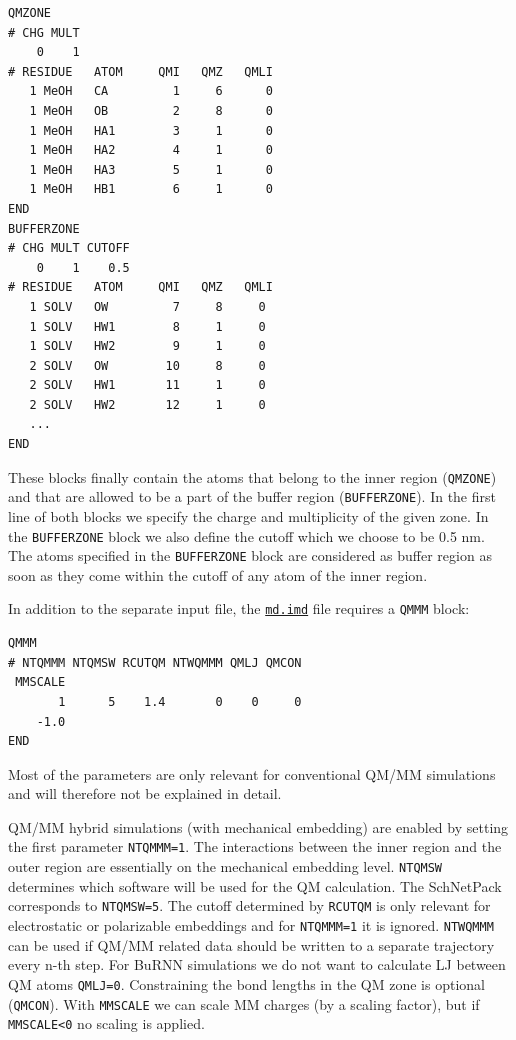 \begin{lstlisting}[breaklines=true, breakatwhitespace=false]
QMZONE
# CHG MULT
    0    1
# RESIDUE   ATOM     QMI   QMZ   QMLI
   1 MeOH   CA         1     6      0
   1 MeOH   OB         2     8      0
   1 MeOH   HA1        3     1      0
   1 MeOH   HA2        4     1      0
   1 MeOH   HA3        5     1      0
   1 MeOH   HB1        6     1      0
END
BUFFERZONE
# CHG MULT CUTOFF 
    0    1    0.5
# RESIDUE   ATOM     QMI   QMZ   QMLI
   1 SOLV   OW         7     8     0
   1 SOLV   HW1        8     1     0
   1 SOLV   HW2        9     1     0
   2 SOLV   OW        10     8     0
   2 SOLV   HW1       11     1     0
   2 SOLV   HW2       12     1     0
   ...
END
\end{lstlisting}


These blocks finally contain the atoms that belong to the inner region (\texttt{QMZONE}) and that are allowed to be a part of the buffer region (\texttt{BUFFERZONE}). In the first line of both blocks we specify the charge and multiplicity of the given zone. In the \texttt{BUFFERZONE} block we also define the cutoff which we choose to be 0.5 nm. The atoms specified in the \texttt{BUFFERZONE} block are considered as buffer region as soon as they come within the cutoff of any atom of the inner region.

In addition to the separate input file, the \href{https://github.com/LierB/gromos_tutorial_livecoms/blob/burnn_tutorial_rc/tutorial_files/t_06/md_burnn/md.imd}{\texttt{md.imd}} file requires a \texttt{QMMM} block:
\begin{lstlisting}[breaklines=true, breakatwhitespace=false]
QMMM
# NTQMMM NTQMSW RCUTQM NTWQMMM QMLJ QMCON      
 MMSCALE
       1      5    1.4       0    0     0
    -1.0
END
\end{lstlisting}

Most of the parameters are only relevant for conventional QM/MM simulations and will therefore not be explained in detail.

QM/MM hybrid simulations (with mechanical embedding) are enabled by setting the first parameter \texttt{NTQMMM=1}. The interactions between the inner region and the outer region are essentially on the mechanical embedding level. \texttt{NTQMSW} determines which software will be used for the QM calculation. The SchNetPack corresponds to \texttt{NTQMSW=5}. The cutoff determined by \texttt{RCUTQM} is only relevant for electrostatic or polarizable embeddings and for \texttt{NTQMMM=1} it is ignored. \texttt{NTWQMMM} can be used if QM/MM related data should be written to a separate trajectory every n-th step. For BuRNN simulations we do not want to calculate LJ between QM atoms \texttt{QMLJ=0}. Constraining the bond lengths in the QM zone is optional (\texttt{QMCON}). With \texttt{MMSCALE} we can scale MM charges (by a scaling factor), but if \texttt{MMSCALE<0} no scaling is applied.

